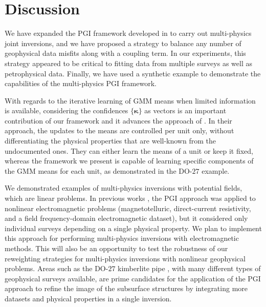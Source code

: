 \documentclass[extra, mreferee]{gji_joint} %
\begin{document}
\section{Discussion}

We have expanded the PGI framework developed in \citet{ggz389} to carry out multi-physics joint inversions, and we have proposed a strategy to balance any number of geophysical data misfits along with a coupling term. In our experiments, this strategy appeared to be critical to fitting data from multiple surveys as well as petrophysical data. Finally, we have used a synthetic example to demonstrate the capabilities of the multi-physics PGI framework.

With regards to the iterative learning of GMM means when limited information is available, considering the confidences $\{\mathbf{\kappa}\}$ as vectors is an important contribution of our framework and it advances the approach of \citet{Sun2016}. In their approach, the updates to the means are controlled per unit only, without differentiating the physical properties that are well-known from the undocumented ones. They can either learn the means of a unit or keep it fixed, whereas the framework we present is capable of learning specific components of the GMM means for each unit, as demonstrated in the DO-$27$ example.

We demonstrated examples of multi-physics inversions with potential fields, which are linear problems. In previous works \citep{ggz389}, the PGI approach was applied to nonlinear electromagnetic problems (magnetotelluric, direct-current resistivity, and a field frequency-domain electromagnetic dataset), but it considered only individual surveys depending on a single physical property. We plan to implement this approach for performing multi-physics inversions with electromagnetic methods. This will also be an opportunity to test the robustness of our reweighting strategies for multi-physics inversions with nonlinear geophysical problems. Areas such as the DO-$27$ kimberlite pipe \citep{TKCpaper, TKCEM, TKCIP}, with many different types of geophysical surveys available, are prime candidates for the application of the PGI approach to refine the image of the subsurface structures by integrating more datasets and physical properties in a single inversion.
\end{document}

